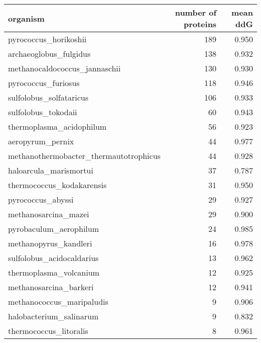 \begin{tabular}{lrr}
\toprule
                               organism &  number of proteins &  mean ddG \\
\midrule
                  pyrococcus\_horikoshii &                 189 &     0.950 \\
                 archaeoglobus\_fulgidus &                 138 &     0.932 \\
          methanocaldococcus\_jannaschii &                 130 &     0.930 \\
                    pyrococcus\_furiosus &                 118 &     0.946 \\
                sulfolobus\_solfataricus &                 106 &     0.933 \\
                    sulfolobus\_tokodaii &                  60 &     0.943 \\
               thermoplasma\_acidophilum &                  56 &     0.923 \\
                       aeropyrum\_pernix &                  44 &     0.977 \\
 methanothermobacter\_thermautotrophicus &                  44 &     0.928 \\
                 haloarcula\_marismortui &                  37 &     0.787 \\
              thermococcus\_kodakarensis &                  31 &     0.950 \\
                      pyrococcus\_abyssi &                  29 &     0.927 \\
                   methanosarcina\_mazei &                  29 &     0.900 \\
                 pyrobaculum\_aerophilum &                  24 &     0.985 \\
                  methanopyrus\_kandleri &                  16 &     0.978 \\
              sulfolobus\_acidocaldarius &                  13 &     0.962 \\
                 thermoplasma\_volcanium &                  12 &     0.925 \\
                 methanosarcina\_barkeri &                  12 &     0.941 \\
              methanococcus\_maripaludis &                   9 &     0.906 \\
                halobacterium\_salinarum &                   9 &     0.832 \\
                 thermococcus\_litoralis &                   8 &     0.961 \\

\end{tabular}
